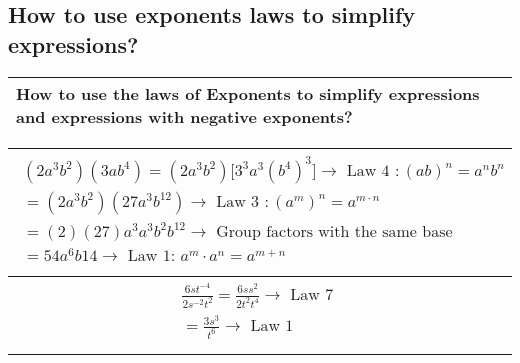 \subsection{How to use exponents laws to simplify expressions?}

\begin{small}
    \begin{tabularx}{1\textwidth}{
            p{}
        }
        \toprule
        How to use the laws of Exponents to simplify expressions and expressions
        with negative exponents?
        \\
        \bottomrule

    \end{tabularx}
\end{small}

\begin{small}
\begin{tabularx}{1\textwidth}{
        p{}
    }
    \toprule
        \begin{multline*}
            \left(2a^3 b^2\right)\left(3a b^4\right) = \left(2a^3b^2\right)\lbrack 3^3a^3\left(b^4\right)^3\rbrack
            \rightarrow \text{ Law 4 }: \left(ab\right)^n = a^nb^n \\
            = \left(2a^3b^2\right)\left(27a^3b^12\right) 
            \rightarrow \text{ Law 3 }:
            \left(a^m\right)^n = a^{m \cdot n} \\
            = \left(2\right)\left(27\right)a^3a^3b^2b^{12}
            \rightarrow \text{ Group factors with the same base } \\
            = 54a^6b{14} \rightarrow \text{ Law 1: } a^m \cdot a^n = a^{m+n} \\
        \end{multline*}
        \\
        \midrule
        \begin{multline*}
            \frac{6st^{-4}}{2s^{-2}t^2} = \frac{6ss^2}{2t^2t^4} \rightarrow
            \text{ Law 7 } \\
            = \frac{3s^3}{t^6} \rightarrow \text{ Law 1 } \\
        \end{multline*}
        \\
    \bottomrule
\end{tabularx}
\end{small}
